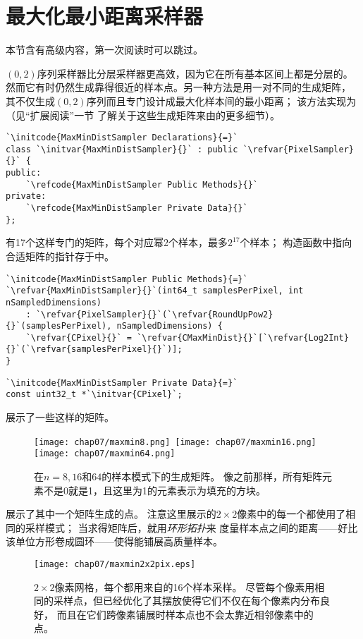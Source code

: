 \section{最大化最小距离采样器}\label{sec:最大化最小距离采样器}
\begin{remark}
    本节含有高级内容，第一次阅读时可以跳过。
\end{remark}

$(0,2)$序列采样器比分层采样器更高效，因为它在所有基本区间上都是分层的。
然而它有时仍然生成靠得很近的样本点。另一种方法是用一对不同的生成矩阵，
其不仅生成$(0,2)$序列而且专门设计成最大化样本间的最小距离；
该方法实现为（见“扩展阅读”一节
了解关于这些生成矩阵来由的更多细节）。

\begin{lstlisting}
`\initcode{MaxMinDistSampler Declarations}{=}`
class `\initvar{MaxMinDistSampler}{}` : public `\refvar{PixelSampler}{}` {
public:
    `\refcode{MaxMinDistSampler Public Methods}{}`
private:
    `\refcode{MaxMinDistSampler Private Data}{}`
};
\end{lstlisting}

有17个这样专门的矩阵，每个对应幂2个样本，最多$2^{17}$个样本；
构造函数中指向合适矩阵的指针存于中。
\begin{lstlisting}
`\initcode{MaxMinDistSampler Public Methods}{=}`
`\refvar{MaxMinDistSampler}{}`(int64_t samplesPerPixel, int nSampledDimensions)
    : `\refvar{PixelSampler}{}`(`\refvar{RoundUpPow2}{}`(samplesPerPixel), nSampledDimensions) {
    `\refvar{CPixel}{}` = `\refvar{CMaxMinDist}{}`[`\refvar{Log2Int}{}`(`\refvar{samplesPerPixel}{}`)];
}
\end{lstlisting}
\begin{lstlisting}
`\initcode{MaxMinDistSampler Private Data}{=}`
const uint32_t *`\initvar{CPixel}`;
\end{lstlisting}

展示了一些这样的矩阵。
\begin{figure}[htbp]
    \centering
    \texttt{[image: chap07/maxmin8.png]}\,
    \texttt{[image: chap07/maxmin16.png]}\,
    \texttt{[image: chap07/maxmin64.png]}
    \caption{在$n=8,16$和$64$的样本模式下的生成矩阵。
        像之前那样，所有矩阵元素不是0就是1，且这里为1的元素表示为填充的方块。}
    \label{fig:7.32}
\end{figure}

展示了其中一个矩阵生成的点。
注意这里展示的$2\times2$像素中的每一个都使用了相同的采样模式；
当求得矩阵后，就用\emph{环形拓扑}来
度量样本点之间的距离——好比该单位方形卷成圆环——使得能铺展高质量样本。
\begin{figure}[htbp]
    \centering\texttt{[image: chap07/maxmin2x2pix.eps]}
    \caption{$2\times2$像素网格，每个都用来自的16个样本采样。
        尽管每个像素用相同的采样点，但已经优化了其摆放使得它们不仅在每个像素内分布良好，
        而且在它们跨像素铺展时样本点也不会太靠近相邻像素中的点。}
    \label{fig:7.33}
\end{figure}

